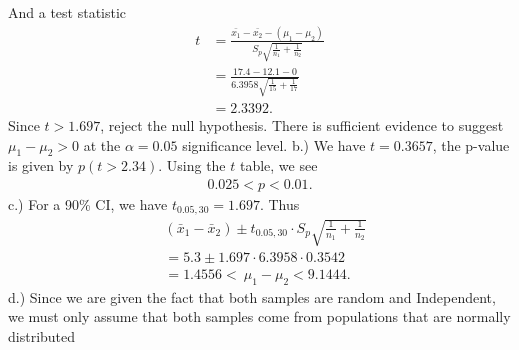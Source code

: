 \documentclass{report}
\begin{document}
 \bigbreak \noindent 
 And a test statistic
 \begin{align*}
     t &= \frac{\bar{x_{1}} - \bar{x_{2}} - (\mu_{1} -\mu_{2})}{S_{p} \sqrt{\frac{1}{n_{1}} + \frac{1}{n_{2}}}}  \\
     &= \frac{17.4 - 12.1 - 0}{6.3958\sqrt{\frac{1}{15} + \frac{1}{17}}} \\
     &=2.3392
 .\end{align*}
 \bigbreak \noindent 
 Since $t > 1.697$, reject the null hypothesis. There is sufficient evidence to suggest $\mu_{1} - \mu_{2} > 0$ at the $\alpha=0.05$ significance level.
 \bigbreak \noindent 
 b.) We have $t=0.3657$, the p-value is given by $p(t > 2.34)$. Using the $t$ table, we see
 \begin{align*}
     0.025 < p < 0.01
 .\end{align*}
 \bigbreak \noindent 
 c.) For a 90\% CI, we have $t_{0.05,30} = 1.697$. Thus
 \begin{align*}
     &(\bar{x}_{1} - \bar{x}_{2}) \pm t_{0.05,30} \cdot S_{p}\sqrt{\frac{1}{n_{1}} + \frac{1}{n_{2}}} \\
     &=5.3 \pm 1.697 \cdot 6.3958 \cdot 0.3542 \\
     &=1.4556 <\ \mu_{1} - \mu_{2} < 9.1444
 .\end{align*}
 \bigbreak \noindent 
 d.) Since we are given the fact that both samples are random and Independent, we must only assume that both samples come from populations that are normally distributed
\end{document}
